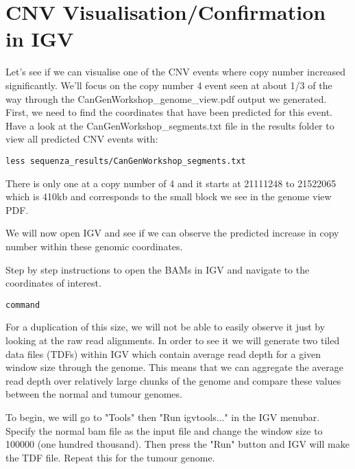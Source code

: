 
\section{CNV Visualisation/Confirmation in IGV}

Let's see if we can visualise one of the CNV events where copy number increased significantly. We'll focus on the copy number 4 event seen at about 1/3 of the way through the CanGenWorkshop\_genome\_view.pdf output we generated. First, we need to find the coordinates that have been predicted for this event. Have a look at the CanGenWorkshop\_segments.txt file in the results folder to view all predicted CNV events with:

\begin{steps}
\begin{lstlisting}
less sequenza_results/CanGenWorkshop_segments.txt
\end{lstlisting}
\end{steps}

There is only one at a copy number of 4 and it starts at 21111248 to 21522065 which is 410kb and corresponds to the small block we see in the genome view PDF.

We will now open IGV and see if we can observe the predicted increase in copy number within these genomic coordinates.

\begin{steps}
Step by step instructions to open the BAMs in IGV and navigate to the coordinates of interest.

\begin{lstlisting}
command
\end{lstlisting}
\end{steps}

For a duplication of this size, we will not be able to easily observe it just by looking at the raw read alignments. In order to see it we will generate two tiled data files (TDFs) within IGV which contain average read depth for a given window size through the genome. This means that we can aggregate the average read depth over relatively large chunks of the genome and compare these values between the normal and tumour genomes.

To begin, we will go to "Tools" then "Run igvtools..." in the IGV menubar. Specify the normal bam file as the input file and change the window size to 100000 (one hundred thousand). Then press the "Run" button and IGV will make the TDF file. Repeat this for the tumour genome.

